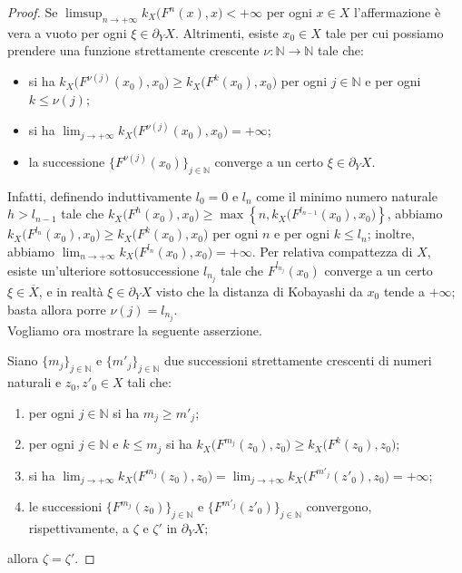 \begin{proof}
    Se $\displaystyle\limsup_{n\longrightarrow+\infty}k_X\big(F^n(x),x\big)<+\infty$ per ogni $x\in X$ l'affermazione è vera a vuoto per ogni $\xi\in\partial_YX$. Altrimenti, esiste $x_0\in X$ tale per cui possiamo prendere una funzione strettamente crescente $\nu:\mathbb{N}\longrightarrow\mathbb{N}$ tale che:
    \begin{itemize}
        \item si ha $k_X\big(F^{\nu(j)}(x_0),x_0\big) \ge k_X\big(F^k(x_0),x_0\big)$ per ogni $j \in \mathbb{N}$ e per ogni $k \le \nu(j)$;
        \item si ha $\displaystyle\lim_{j\longrightarrow+\infty}k_X\big(F^{\nu(j)}(x_0),x_0\big)=+\infty$;
        \item la successione $\{F^{\nu(j)}(x_0)\}_{j\in\mathbb{N}}$ converge a un certo $\xi\in\partial_YX$.
    \end{itemize}
    
    Infatti, definendo induttivamente $l_0=0$ e $l_n$ come il minimo numero naturale $h>l_{n-1}$ tale che $k_X\big(F^h(x_0),x_0\big) \ge \max\left\{n,k_X\big(F^{l_{n-1}}(x_0),x_0\big)\right\}$, abbiamo $k_X\big(F^{l_n}(x_0),x_0\big) \ge k_X\big(F^k(x_0),x_0\big)$ per ogni $n$ e per ogni $k \le l_n$; inoltre, abbiamo $\displaystyle\lim_{n\longrightarrow+\infty}k_X\big(F^{l_n}(x_0),x_0\big)=+\infty$. Per relativa compattezza di $X$, esiste un'ulteriore sottosuccessione $l_{n_j}$ tale che $F^{l_{n_j}}(x_0)$ converge a un certo $\xi\in\overline{X}$, e in realtà $\xi\in\partial_YX$ visto che la distanza di Kobayashi da $x_0$ tende a $+\infty$; basta allora porre $\nu(j)=l_{n_j}$.\\

    Vogliamo ora mostrare la seguente asserzione.

    Siano $\{m_j\}_{j\in\mathbb{N}}$ e $\{m'_j\}_{j\in\mathbb{N}}$ due successioni strettamente crescenti di numeri naturali e $z_0,z'_0\in X$ tali che:
    \begin{enumerate}[label={(\arabic*)}]
        \item per ogni $j\in\mathbb{N}$ si ha $m_j \ge m'_j$;
        \item per ogni $j\in\mathbb{N}$ e $k \le m_j$ si ha $k_X\big(F^{m_j}(z_0),z_0\big) \ge k_X\big(F^k(z_0),z_0\big)$;
        \item si ha $\displaystyle\lim_{j\longrightarrow+\infty}k_X\big(F^{m_j}(z_0),z_0\big)=\lim_{j\longrightarrow+\infty}k_X\big(F^{m'_j}(z'_0),z_0\big)=+\infty$;
        \item le successioni $\{F^{m_j}(z_0)\}_{j\in\mathbb{N}}$ e $\{F^{m'_j}(z'_0)\}_{j\in\mathbb{N}}$ convergono, rispettivamente, a $\zeta$ e $\zeta'$ in $\partial_YX$;
    \end{enumerate}
    allora $\zeta=\zeta'$.


\end{proof}
